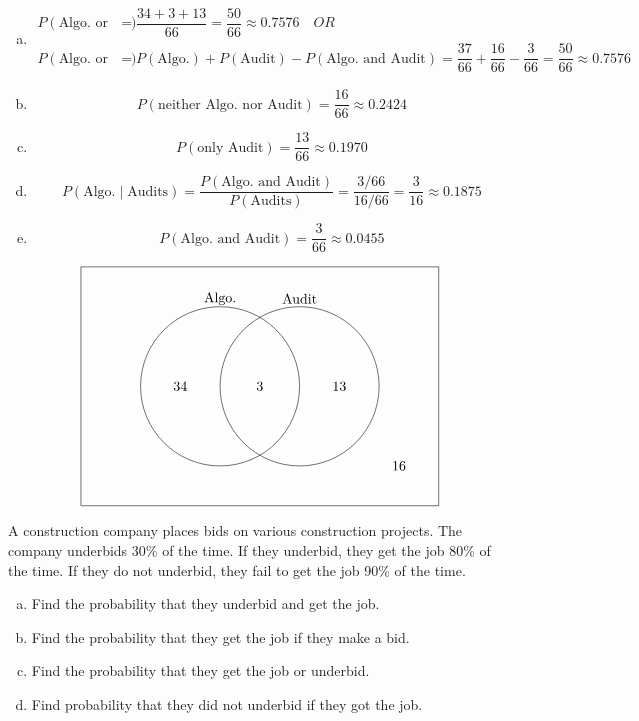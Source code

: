 \documentclass[11pt,letterpaper]{article}
\begin{document}
\sol
\begin{enumerate}[(a)]
\item 
	\[
	\begin{aligned}
	P(\text{Algo. or Audit})&= \dfrac{34 + 3 + 13}{66}= \dfrac{50}{66} \approx 0.7576 \quad \textit{OR} \\
	P(\text{Algo. or Audit})&= P(\text{Algo.}) + P(\text{Audit}) - P(\text{Algo. and Audit})= \dfrac{37}{66} + \dfrac{16}{66} - \dfrac{3}{66}= \dfrac{50}{66} \approx 0.7576
	\end{aligned}
	\]

\item 
	\[
	P(\text{neither Algo. nor Audit})= \dfrac{16}{66} \approx 0.2424
	\]

\item 
	\[
	P(\text{only Audit})= \dfrac{13}{66} \approx 0.1970
	\]

\item 
	\[
	P(\text{Algo.} \;|\; \text{Audits})= \dfrac{P(\text{Algo. and Audit})}{P(\text{Audits})}= \dfrac{3/66}{16/66}= \dfrac{3}{16} \approx 0.1875
	\]

\item 
	\[
	P(\text{Algo. and Audit})= \dfrac{3}{66} \approx 0.0455
	\]
\end{enumerate}

	\[
	\begin{tikzpicture}
	\draw (0,0) rectangle (9,6);
	\draw (3.5,3) circle (2);
	\draw (5.5,3) circle (2);
	
	\node at (3.5,5.2) {Algo.};
	\node at (5.5,5.2) {Audit}; 
	
	\node at (2.5,3) {34};
	\node at (4.5,3) {3};
	\node at (6.5,3) {13};
	\node at (8,1) {16};
	\end{tikzpicture}
	\]





\newpage





 A construction company places bids on various construction projects. The company underbids 30\% of the time. If they underbid, they get the job 80\% of the time. If they do not underbid, they fail to get the job 90\% of the time. 
	\begin{enumerate}[(a)]
	\item Find the probability that they underbid and get the job.
	\item Find the probability that they get the job if they make a bid. 
	\item Find the probability that they get the job or underbid. 
	\item Find probability that they did not underbid if they got the job. 
	\end{enumerate} \pspace
\end{document}
